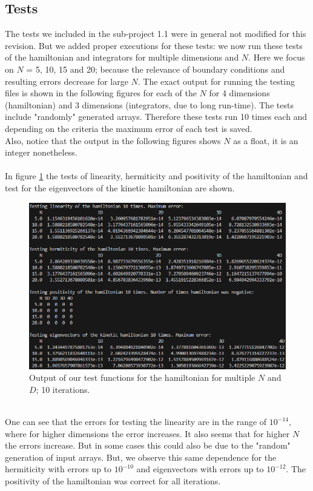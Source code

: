 \documentclass[11pt, letterpaper, onecolumn]{article}
\begin{document}
	\subsection{Tests}
	The tests we included in the sub-project 1.1 were in general not modified for this revision. But we added proper executions for these tests: we now run these tests of the hamiltonian and integrators for multiple dimensions and $N$. Here we focus on $N$ = 5, 10, 15 and 20; because the relevance of boundary conditions and resulting errors decrease for large $N$. The exact output for running the testing files is shown in the following figures for each of the $N$ for 4 dimensions (hamiltonian) and 3 dimensions (integrators, due to long run-time). The tests include "randomly" generated arrays. Therefore these tests run 10 times each and depending on the criteria the maximum error of each test is saved.\\
	Also, notice that the output in the following figures shows $N$ as a float, it is an integer nonetheless.
	\\
	\\
	In figure \ref{fig:test-hamiltonian} the tests of linearity, hermiticity and positivity of the hamiltonian and test for the eigenvectors of the kinetic hamiltonian are shown.
	\begin{figure} [h] 
	\begin{center}
	\includegraphics[width=15cm]{"test_hamiltonian2.png"}
	\caption{Output of our test functions for the hamiltonian for multiple $N$ and $D$; 10 iterations.} 	\label{fig:test-hamiltonian}
	\end{center}	
	\end{figure}
	\\
	One can see that the errors for testing the linearity are in the range of $10^{-14}$, where for higher dimensions the error increases. It also seems that for higher $N$ the errors increase. But in some cases this could also be due to the "random" generation of input arrays. But, we observe this same dependence for the hermiticity with errors up to $10^{-10}$ and eigenvectors with errors up to $10^{-12}$. The positivity of the hamiltonian was correct for all iterations.\\
\end{document}
